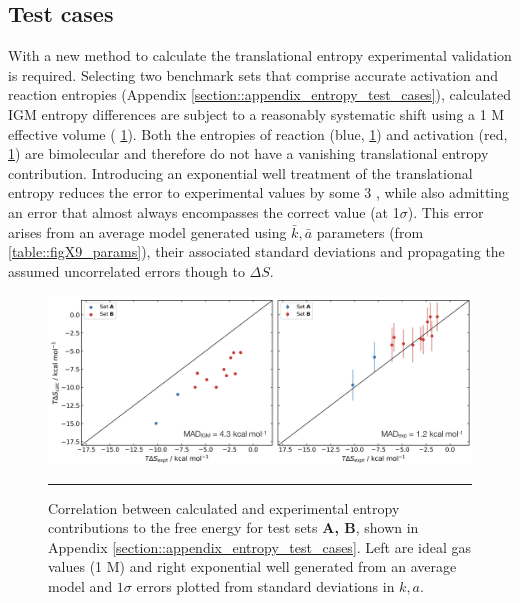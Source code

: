 \documentclass[../main.tex]{subfiles}
\begin{document}
\subsection{Test cases}

With a new method to calculate the translational entropy experimental validation is required. Selecting two benchmark sets that comprise accurate activation and reaction entropies (Appendix \ref{section::appendix_entropy_test_cases}), calculated IGM entropy differences are subject to a reasonably systematic shift using a 1 M effective volume (\figurename{ \ref{fig::entropy_X10}}). Both the entropies of reaction (blue, \figurename{ \ref{fig::entropy_X10}}) and activation (red, \figurename{ \ref{fig::entropy_X10}}) are bimolecular and therefore do not have a vanishing translational entropy contribution. Introducing an exponential well treatment of the translational entropy reduces the error to experimental values by some 3 \kcal, while also admitting an error that almost always encompasses the correct value (at 1$\sigma$). This error arises from an average model generated using $\bar{k}, \bar{a}$ parameters (from \tablename{ \ref{table::figX9_params}}), their associated standard deviations and propagating the assumed uncorrelated errors though to $\Delta S$. 

\vspace{0.3cm}
\begin{figure}[h!]
	\includegraphics[width=\textwidth]{4/figs/figX10/figX10}
	\vspace{0.2cm}
	\hrule
	\caption{Correlation between calculated and experimental entropy contributions to the free energy for test sets {\bfseries{A, B}}, shown in Appendix \ref{section::appendix_entropy_test_cases}. Left are ideal gas values (1 M) and right exponential well generated from an average model and $1\sigma$ errors plotted from standard deviations in $k, a$.} 
	\label{fig::entropy_X10}
\end{figure}
\end{document}
